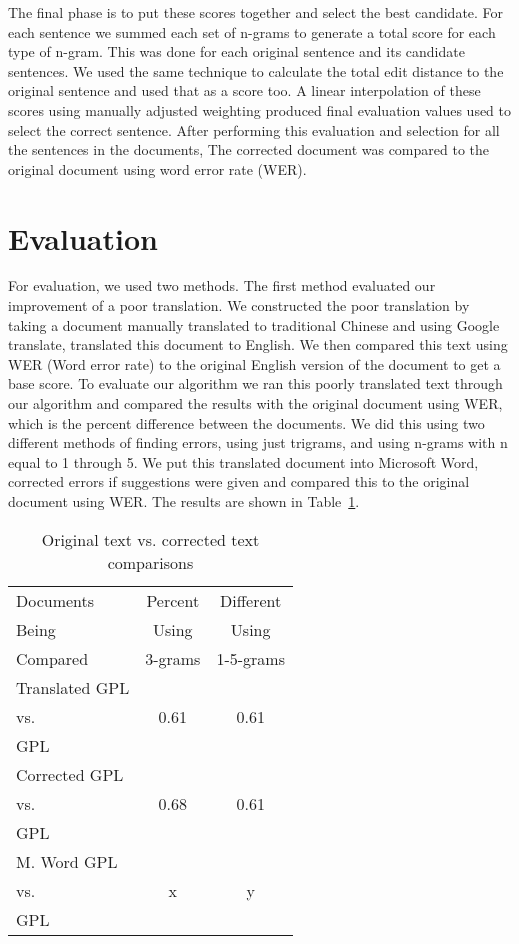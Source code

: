 \documentclass[twocolumn]{article}
\begin{document}
The final phase is to put these scores together and select the best candidate. For each sentence we summed each set of n-grams to generate a total score for each type of n-gram. This was done for each original sentence and its candidate sentences. We used the same technique to calculate the total edit distance to the original sentence and used that as a score too. A linear interpolation of these scores using manually adjusted weighting produced final evaluation values used to select the correct sentence. After performing this evaluation and selection for all the sentences in the documents, The corrected document was compared to the original document using word error rate (WER).

\section{Evaluation}
For evaluation, we used two methods. The first method evaluated our improvement of a poor translation. We constructed the poor translation by taking a document manually translated to traditional Chinese and using Google translate, translated this document to English. We then compared this text using WER (Word error rate) to the original English version of the document to get a base score. To evaluate our algorithm we ran this poorly translated text through our algorithm and compared the results with the original document using WER, which is the percent difference between the documents. We did this using two different methods of finding errors, using just trigrams, and using n-grams with n equal to 1 through 5. We put this translated document into Microsoft Word, corrected errors if suggestions were given and compared this to the original document using WER. The results are shown in Table~\ref{gpl}.

\begin{table}[t]
\centering
\begin{tabular}{ | l | cc | }
\hline
Documents & Percent & Different \\
\cline{2-3} Being & Using & \multicolumn{1}{|c|}{Using} \\
Compared & 3-grams & \multicolumn{1}{|c|}{1-5-grams} \\
\hline
Translated GPL & & \multicolumn{1}{|c|}{} \\
vs. & 0.61 & \multicolumn{1}{|c|}{0.61} \\
GPL & & \multicolumn{1}{|c|}{} \\
\hline
Corrected GPL & & \multicolumn{1}{|c|}{} \\
vs. & 0.68 & \multicolumn{1}{|c|}{0.61} \\
GPL & & \multicolumn{1}{|c|}{} \\
\hline
M. Word GPL & & \multicolumn{1}{|c|}{} \\
vs. & x & \multicolumn{1}{|c|}{y} \\
GPL & & \multicolumn{1}{|c|}{} \\
\hline
\end{tabular}
\caption{Original text vs. corrected text comparisons}
\label{gpl}
\end{table}
\end{document}
